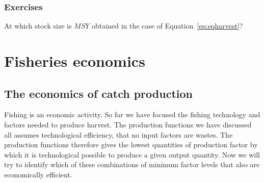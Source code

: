 \documentclass[11pt,fleqn]{book} %
\begin{document}
\begin{figure}[!htb]
\end{figure}

\section*{Exercises}

\begin{exercise}
At which stock size is $MSY$ obtained in the case of Equation~\ref{eq:eqharvest}?
\end{exercise}




\part{Fisheries economics}

\chapter{The economics of catch production} \label{chapter 6}
Fishing is an economic activity. So far we have focused the fishing technology and factors needed to produce harvest. The production functions we have discussed all assumes technological efficiency, that no input factors are wastes. The production functions therefore gives the lowest quantities of production factor by which it is technological possible to produce a given output quantity. Now we will try to identify which of these combinations of minimum factor levels that also are economically efficient.
\end{document}

